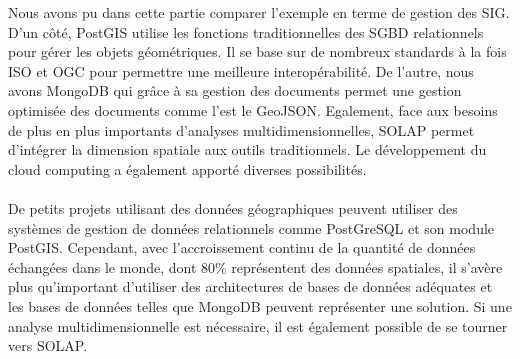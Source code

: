 Nous avons pu dans cette partie comparer l'exemple en terme de gestion des SIG. D'un côté, PostGIS utilise les fonctions traditionnelles des SGBD relationnels pour gérer les objets géométriques. Il se base sur de nombreux standards à la fois ISO et OGC pour permettre une meilleure interopérabilité. De l'autre, nous avons MongoDB qui grâce à sa gestion des documents permet une gestion optimisée des documents comme l'est le GeoJSON. Egalement, face aux besoins de plus en plus importants d'analyses multidimensionnelles, SOLAP permet d'intégrer la dimension spatiale aux outils traditionnels. Le développement du cloud computing a également apporté diverses possibilités.

\paragraph{}De petits projets utilisant des données géographiques peuvent utiliser des systèmes de gestion de données relationnels comme PostGreSQL et son module PostGIS. Cependant, avec l'accroissement continu de la quantité de données échangées dans le monde, dont 80\% représentent des données spatiales, il s'avère plus qu'important d'utiliser des architectures de bases de données adéquates et les bases de données telles que MongoDB peuvent représenter une solution. Si une analyse multidimensionnelle est nécessaire, il est également possible de se tourner vers SOLAP.